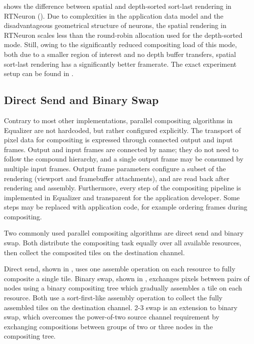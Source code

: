  shows the difference between spatial and depth-sorted
sort-last rendering in RTNeuron (). Due to complexities in the
application data model and the disadvantageous geometrical structure of
neurons, the spatial rendering in RTNeuron scales less than the
round-robin allocation used for the depth-sorted mode. Still, owing to the
significantly reduced compositing load of this mode, both due to a smaller
region of interest and no depth buffer transfers, spatial sort-last rendering
has a significantly better framerate. The exact experiment setup can be found
in \cite{EBAHMP:12}.

\subsection{Direct Send and Binary Swap}

Contrary to most other implementations, parallel compositing algorithms in
Equalizer are not hardcoded, but rather configured explicitly. The transport
of pixel data for compositing is expressed through
connected output and input frames. Output and input frames are connected by
name; they do not need to follow the compound hierarchy, and a single output
frame may be consumed by multiple input frames. Output frame parameters
configure a subset of the rendering (viewport and framebuffer attachments), and
are read back after rendering and assembly. Furthermore, every step of the
compositing pipeline is implemented in Equalizer and transparent for the
application developer. Some steps may be replaced with application code, for
example ordering frames during compositing.

Two commonly used parallel compositing algorithms are direct send and binary
swap. Both distribute the compositing task equally over all available
resources, then collect the composited tiles on the destination channel.

Direct send, shown in , uses one assemble operation on each
resource to fully composite a single tile. Binary swap, shown in ,
exchanges pixels between pairs of nodes using a binary compositing tree which
gradually assembles a tile on each resource. Both use a sort-first-like
assembly operation to collect the fully assembled tiles on the destination
channel. 2-3 swap \cite{Yu:2008:MPV:1413370.1413419} is an extension to binary
swap, which overcomes the power-of-two source channel requirement by exchanging
compositions between groups of two or three nodes in the compositing tree.

